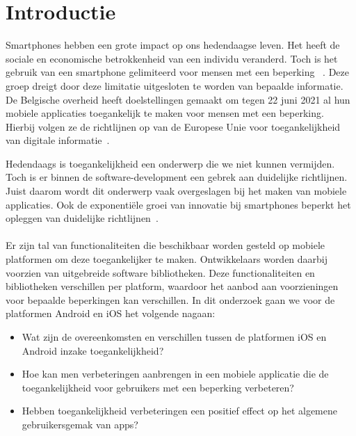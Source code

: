 
\section{Introductie} %
\label{sec:introductie}

Smartphones hebben een grote impact op ons hedendaagse leven. Het heeft de sociale en economische betrokkenheid van een individu veranderd.  Toch is het gebruik van een smartphone gelimiteerd voor mensen met een beperking
~\autocite{morris2014wireless}. Deze groep dreigt door deze limitatie uitgesloten te worden van bepaalde informatie. De Belgische overheid heeft doelstellingen gemaakt om tegen 22 juni 2021 al hun mobiele applicaties toegankelijk te maken voor mensen met een beperking. Hierbij volgen ze de richtlijnen op van de Europese Unie voor toegankelijkheid van digitale informatie~\autocite{Knacktoegankelijkheid2018}.

Hedendaags is toegankelijkheid een onderwerp die we niet kunnen vermijden. Toch is er binnen de software-development een gebrek aan duidelijke richtlijnen. Juist daarom wordt dit onderwerp vaak overgeslagen bij het maken van mobiele applicaties. Ook de exponentiële groei van innovatie bij smartphones beperkt het opleggen van duidelijke richtlijnen~\autocite{diaz2014accessibility}. 
\\~\\
Er zijn  tal van functionaliteiten die beschikbaar worden gesteld op mobiele platformen om deze toegankelijker te maken. Ontwikkelaars worden daarbij voorzien van uitgebreide software bibliotheken. Deze functionaliteiten en bibliotheken verschillen per platform, waardoor het aanbod aan voorzieningen voor bepaalde beperkingen kan verschillen. In dit onderzoek gaan we voor de platformen Android en iOS het volgende nagaan:




\begin{itemize}
    \setlength\itemsep{0.5 em}
    \item Wat zijn de overeenkomsten en verschillen tussen de platformen iOS en Android inzake toegankelijkheid?
  \item Hoe kan men verbeteringen aanbrengen in een mobiele applicatie die de toegankelijkheid voor gebruikers met een beperking verbeteren?
  \item Hebben toegankelijkheid verbeteringen een positief effect op het algemene gebruikersgemak van apps? 
  
\end{itemize}

